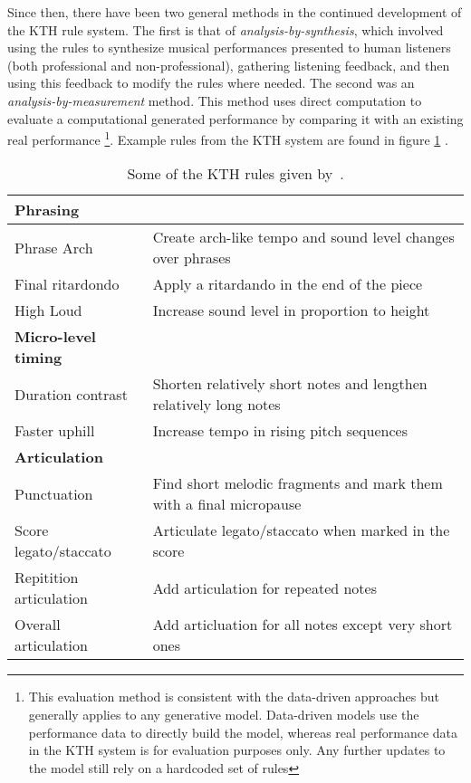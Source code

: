 Since then, there have been two general methods in the continued development of the KTH rule system. The first is that of \emph{analysis-by-synthesis}, which involved using the rules to synthesize musical performances presented to human listeners (both professional and non-professional), gathering listening feedback, and then using this feedback to modify the rules where needed. The second was an \emph{analysis-by-measurement} method. This method uses direct computation to evaluate a computational generated performance by comparing it with an existing real performance \footnote{This evaluation method is consistent with the data-driven approaches but generally applies to any generative model. Data-driven models use the performance data to directly build the model, whereas real performance data in the KTH system is for evaluation purposes only. Any further updates to the model still rely on a hardcoded set of rules}. Example rules from the KTH system are found in figure \ref{tab:kth-rules} . 


\begin{table}
    \setlength{\extrarowheight}{7pt}
    \begin{center}
    \begin{tabular}{l | l }
        \textbf{Phrasing} & \\
        \hline
        Phrase Arch & Create arch-like tempo and sound level changes over phrases \\
        Final ritardondo & Apply a ritardando in the end of the piece \\
        High Loud & Increase sound level in proportion to height \\
        \textbf{Micro-level timing} & \\
        \hline
        Duration contrast & Shorten relatively short notes and lengthen relatively long notes \\ 
        Faster uphill & Increase tempo in rising pitch sequences \\
        \textbf{Articulation} & \\
        \hline
        Punctuation & Find short melodic fragments and mark them with a final micropause \\
        Score legato/staccato & Articulate legato/staccato when marked in the score \\
        Repitition articulation & Add articulation for repeated notes \\
        Overall articulation & Add articluation for all notes except very short ones 
    \end{tabular}
    \caption{Some of the KTH rules given by~\citet{friberg2006overview}.}
    \label{tab:kth-rules}
    \end{center}
\end{table}


